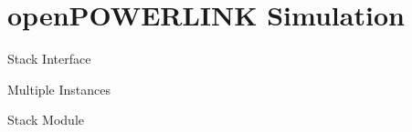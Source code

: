 \section{openPOWERLINK Simulation}
\begin{frame}{Stack Interface}
\end{frame}

\begin{frame}{Multiple Instances}
\end{frame}

\begin{frame}{Stack Module}
\end{frame}